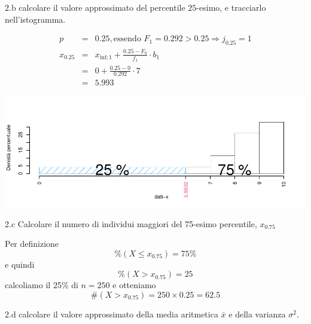 \documentclass[
  11pt,
]{book}
\theoremstyle{mytheoremstyle}
\theoremstyle{mydefstyle}
\newenvironment{sol}
  {
  \begin{tcolorbox}[enhanced,breakable,arc=0.1mm,boxrule=1pt,colback=white,colframe=iblue,
  title=\bf \fontfamily{lmss}\selectfont \hspace{.5 cm} Soluzione,drop fuzzy shadow]

}{
\end{tcolorbox}
  }
\begin{document}
2.b calcolare il valore approssimato del percentile \(25\)-esimo, e tracciarlo nell'istogramma.

\begin{sol}

\begin{eqnarray*}
  p &=&  0.25 , \text{essendo }F_{ 1 }= 0.292  > 0.25  \Rightarrow j_{ 0.25 }= 1 \\
  x_{ 0.25 } &=& x_{\text{inf}; 1 } + \frac{ { 0.25 } - F_{ 0 }} {f_{ 1 }} \cdot b_{ 1 } \\
            &=&  0  + \frac {{ 0.25 } -  0 } { 0.292 } \cdot  7  \\
            &=&  5.993 
\end{eqnarray*}

\begin{center}\includegraphics{Esami_passati_con_soluzioni_files/figure-latex/01-descr-8-1} \end{center}

\end{sol}

2.c Calcolare il numero di individui maggiori del 75-esimo percentile, \(x_{0.75}\)

\begin{sol}
Per definizione
\[
\%(X\le x_{0.75})=75\%
\]
e quindi
\[
\%(X> x_{0.75}) = 25%
\]
calcoliamo il 25\% di \(n=250\) e otteniamo
\[
\#(X>x_{0.75})=250\times 0.25=62.5
\]

\end{sol}

2.d calcolare il valore approssimato della media aritmetica \(\bar x\) e della varianza \(\sigma^2\).
\end{document}
